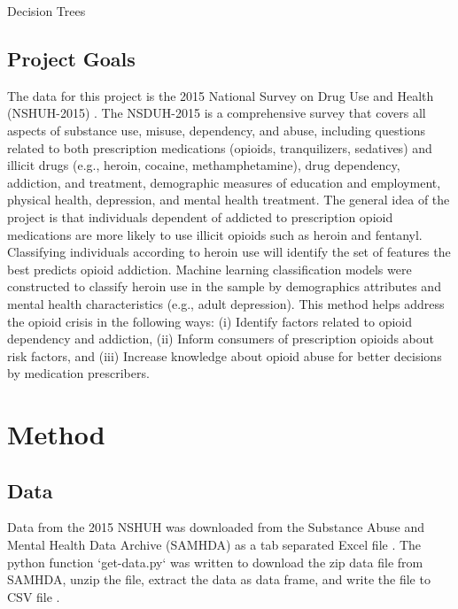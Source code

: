 \documentclass[sigconf]{acmart}
\begin{document}
Decision Trees




\subsection{Project Goals} 

The data for this project is the 2015 National Survey on Drug Use and Health 
(NSHUH-2015) \cite{samhsa16}. The NSDUH-2015 is a comprehensive survey that 
covers all aspects of substance use, misuse, dependency, and abuse, including 
questions related to both prescription medications (opioids, tranquilizers, 
sedatives) and illicit drugs (e.g., heroin, cocaine, methamphetamine), drug 
dependency, addiction, and treatment, demographic measures of education and 
employment, physical health, depression, and mental health treatment. The 
general idea of the project is that individuals dependent of addicted to 
prescription opioid medications are more likely to use illicit opioids such 
as heroin and fentanyl. Classifying individuals according to heroin use will 
identify the set of features the best predicts opioid addiction. Machine 
learning classification models were constructed to classify heroin use 
in the sample by demographics attributes and mental health characteristics 
(e.g., adult depression). This method helps address the opioid crisis in 
the following ways: (i) Identify factors related to opioid dependency and addiction, (ii) Inform consumers of prescription opioids about risk factors, 
and (iii) Increase knowledge about opioid abuse for better decisions by 
medication prescribers. 




\section{Method}

\subsection{Data} 

Data from the 2015 NSHUH was downloaded from the Substance Abuse and Mental 
Health Data Archive (SAMHDA) as a tab separated Excel file \cite{samhsa16}. 
The python function `get-data.py` was written to download the zip data file
from SAMHDA, unzip the file, extract the data as data frame, and write the
file to CSV file \cite{getdata17}.
\end{document}
